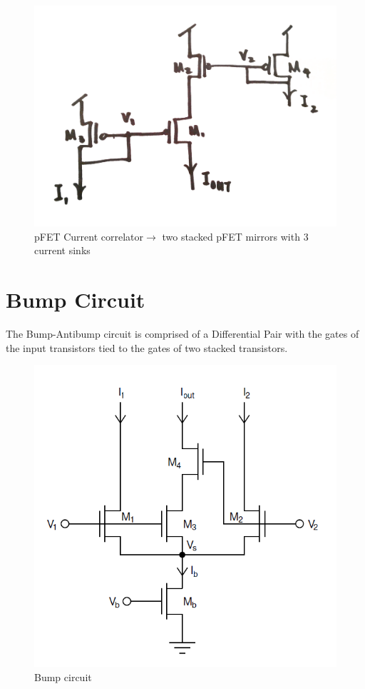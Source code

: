 \begin{figure}[htbp]
  \centering
  \includegraphics[scale=0.2]{pics/pFET_Current_correlator_circuit.png}
  \caption{pFET Current correlator$ \rightarrow$ two stacked pFET mirrors with 3 current sinks}
  \label{fig:pFET_Current_correlator_circuit}
\end{figure}




\section{Bump Circuit}

The Bump-Antibump circuit is comprised of a Differential Pair with the gates of the input transistors tied to the gates of two stacked transistors. 

\begin{figure}[htbp]
  \centering
  \includegraphics[scale=0.7]{pics/Bump-Antibump_circuit.png}
  \caption{Bump circuit}
  \label{fig:Bump-Antibump_circuit}
\end{figure}


